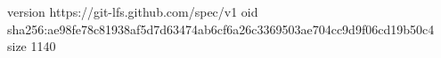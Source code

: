 version https://git-lfs.github.com/spec/v1
oid sha256:ae98fe78c81938af5d7d63474ab6cf6a26c3369503ae704cc9d9f06cd19b50c4
size 1140
